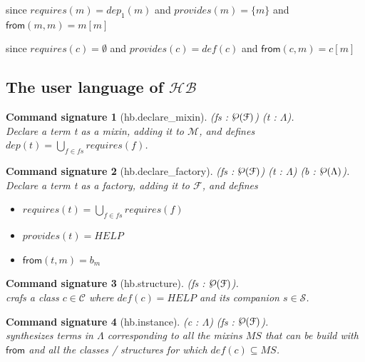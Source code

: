 \documentclass[a4paper,UKenglish,cleveref, autoref]{lipics-v2019}
\newcommand{\HB}{\ensuremath{\mathcal{HB}}}
\newcommand{\Lang}{\ensuremath{\Lambda}}
\newcommand{\mixin}{mixin}
\newcommand{\mixins}{mixins}
\newcommand{\M}{\ensuremath{\mathcal{M}}}
\newcommand{\factory}{factory}
\newcommand{\F}{\ensuremath{\mathcal{F}}}
\newcommand{\dep}{\ensuremath{dep}}
\newcommand{\depone}{\ensuremath{dep_1}}
\newcommand{\powerset}[1]{\raisebox{.15\baselineskip}{\Large\ensuremath{\wp}}(#1)}
\newcommand{\C}{\ensuremath{\mathcal{C}}}
\newcommand{\classes}{classes}
\newcommand{\cdef}{\ensuremath{def}}
\newcommand{\Str}{\ensuremath{\mathcal{S}}}
\newcommand{\structures}{structures}
\newcommand{\requires}{\ensuremath{requires}}
\newcommand{\provides}{\ensuremath{provides}}
\newcommand{\from}{\ensuremath{\mathsf{from}}}
\newcommand{\proj}[2]{\ensuremath{#1[#2]}}
\theoremstyle{implem}
\theoremstyle{implem}
\theoremstyle{axiom}
\theoremstyle{abscommand}
\newtheorem*{abscommand}{Command signature}
\theoremstyle{command}
\begin{document}
\begin{proposition}[\( \M{} \subseteq \F{} \)]
  since \(\requires{}(m) = \depone{}(m)\)
  and \(\provides{}(m) = \{m\} \)
  and \(\from{}(m,m) = \proj{m}{m} \)
\end{proposition}

\begin{proposition}[\( \C{} \subseteq \F{} \)]
  since \(\requires{}(c) = \emptyset \)
  and \(\provides{}(c) = \cdef{}(c) \)
  and \(\from{}(c,m) = \proj{c}{m} \)
\end{proposition}

\subsection{The user language of \HB{}}

\begin{abscommand}[hb.declare_mixin] (fs : $\powerset\F{}$) (t : \Lang{}).\\
Declare a term t as a \mixin{}, adding it to \M{}, and defines
\( \dep{}(t) = \bigcup_{f \in fs} \requires{}(f) \).
\end{abscommand}

\begin{abscommand}[hb.declare_factory] (fs : $\powerset\F{}$) (t : \Lang{}) (b : $\powerset\Lang{}$).\\
Declare a term t as a \factory{}, adding it to \F{}, and defines
\begin{itemize}
\item \( \requires{}(t) = \bigcup_{f \in fs} \requires{}(f) \)
\item \( \provides{}(t) = HELP \)
\item \( \from{}(t,m) = b_m \)
\end{itemize}
\end{abscommand}

\begin{abscommand}[hb.structure] (fs : $\powerset\F{}$).\\
crafs a class $c \in \C{}$ where $\cdef{}(c) = HELP$ and its companion $s \in \Str{}$.
\end{abscommand}

\begin{abscommand}[hb.instance] (c : $\Lang{}$) (fs : $\powerset\F{}$).\\
synthesizes terms in $\Lang{}$ corresponding to all the \mixins{} $MS$
that can be build with \from{} and all the \classes{} / \structures{}
for which \( \cdef{}(c) \subseteq MS \).
\end{abscommand}
\end{document}
